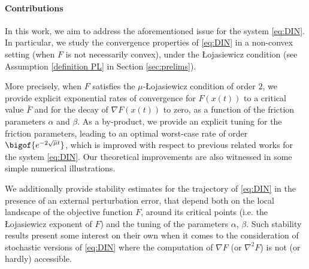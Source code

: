 \documentclass[reqno]{amsart}
\theoremstyle{plain}
\theoremstyle{definition}
\theoremstyle{remark}
\begin{document}
 




\paragraph{Contributions}

In this work, we aim to address the aforementioned issue for the system \eqref{eq:DIN}. In particular, we study the convergence properties of \eqref{eq:DIN} in a non-convex setting (when $F$ is not necessarily convex), under the \L ojasiewicz condition \cite{Loja63,polyak1964some} (see Assumption \ref{definition PL} in Section \ref{sec:prelims}).

More precisely, when $F$ satisfies the $\mu$-\L ojasiewicz condition of order $2$, we provide explicit exponential rates of convergence for $F(x(t))$ to a critical value $\bar{F}$ and for the decay of $\nabla F(x(t))$ to zero, as a function of the friction parameters $\alpha$ and $\beta$. As a by-product, we provide an explicit tuning for the friction parameters, leading to an optimal worst-case rate of order $\bigof{e^{-2\sqrt{\mu}t}}$, which is improved with respect to previous related works \cite{alvarez2002second,attouch2022first,castera2021inertial,maulen2024inertial,wang2025accelerated} for the system \eqref{eq:DIN}. Our theoretical improvements are also witnessed in some simple numerical illustrations.

We additionally provide stability estimates for the trajectory of \eqref{eq:DIN} in the presence of an external perturbation error, that depend both on the local landscape of the objective function $F$, around its critical points (i.e. the \L ojasiewicz exponent of $F$) and the tuning of the parameters $\alpha$, $\beta$. Such stability results present some interest on their own when it comes to the consideration of stochastic versions of \eqref{eq:DIN} where the computation of $\nabla F$ (or $\nabla^{2}F$) is not (or hardly) accessible.
\end{document}
